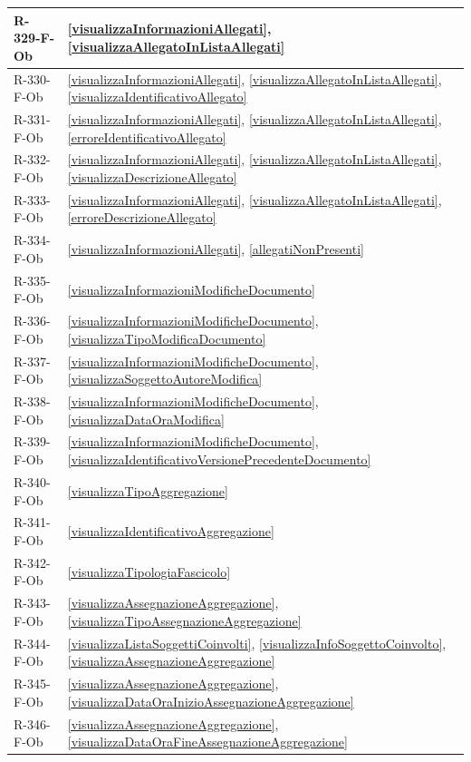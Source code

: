 \begin{longtable}{|p{4cm}|p{10cm}|}
\hline
R-329-F-Ob & \ref{visualizzaInformazioniAllegati}, \ref{visualizzaAllegatoInListaAllegati} \\
\hline
R-330-F-Ob & \ref{visualizzaInformazioniAllegati}, \ref{visualizzaAllegatoInListaAllegati}, \ref{visualizzaIdentificativoAllegato} \\
\hline
R-331-F-Ob & \ref{visualizzaInformazioniAllegati}, \ref{visualizzaAllegatoInListaAllegati}, \ref{erroreIdentificativoAllegato} \\
\hline
R-332-F-Ob & \ref{visualizzaInformazioniAllegati}, \ref{visualizzaAllegatoInListaAllegati}, \ref{visualizzaDescrizioneAllegato} \\
\hline
R-333-F-Ob & \ref{visualizzaInformazioniAllegati}, \ref{visualizzaAllegatoInListaAllegati}, \ref{erroreDescrizioneAllegato} \\
\hline
R-334-F-Ob & \ref{visualizzaInformazioniAllegati}, \ref{allegatiNonPresenti} \\
\hline
R-335-F-Ob & \ref{visualizzaInformazioniModificheDocumento} \\
\hline
R-336-F-Ob & \ref{visualizzaInformazioniModificheDocumento}, \ref{visualizzaTipoModificaDocumento} \\
\hline
R-337-F-Ob & \ref{visualizzaInformazioniModificheDocumento}, \ref{visualizzaSoggettoAutoreModifica} \\
\hline
R-338-F-Ob & \ref{visualizzaInformazioniModificheDocumento}, \ref{visualizzaDataOraModifica} \\
\hline
R-339-F-Ob & \ref{visualizzaInformazioniModificheDocumento}, \ref{visualizzaIdentificativoVersionePrecedenteDocumento} \\
\hline
R-340-F-Ob & \ref{visualizzaTipoAggregazione} \\
\hline
R-341-F-Ob & \ref{visualizzaIdentificativoAggregazione} \\
\hline
R-342-F-Ob & \ref{visualizzaTipologiaFascicolo} \\
\hline
R-343-F-Ob & \ref{visualizzaAssegnazioneAggregazione}, \ref{visualizzaTipoAssegnazioneAggregazione} \\
\hline
R-344-F-Ob & \ref{visualizzaListaSoggettiCoinvolti}, \ref{visualizzaInfoSoggettoCoinvolto}, \ref{visualizzaAssegnazioneAggregazione} \\
\hline
R-345-F-Ob & \ref{visualizzaAssegnazioneAggregazione}, \ref{visualizzaDataOraInizioAssegnazioneAggregazione} \\
\hline
R-346-F-Ob & \ref{visualizzaAssegnazioneAggregazione}, \ref{visualizzaDataOraFineAssegnazioneAggregazione} \\

\end{longtable}
